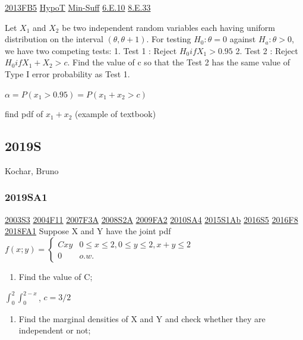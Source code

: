\documentclass[10pt,twocolumn,portrait]{article}
\providecommand{\tightlist}{%
  \setlength{\itemsep}{0pt}\setlength{\parskip}{0pt}}
\begin{document}
\protect\hyperlink{fb5}{2013FB5} \protect\hyperlink{HypoT}{HypoT}
\protect\hyperlink{Min-Suff}{Min-Suff} \protect\hyperlink{e.10}{6.E.10}
\protect\hyperlink{e.33}{8.E.33}

Let \(X_1\) and \(X_2\) be two independent random variables each having
uniform distribution on the interval \((\theta,\theta+1)\). For testing
\(H_0:\theta=0\) against \(H_a:\theta> 0\), we have two competing tests:
1. Test 1 : Reject \(H_0 if X_1>0.95\) 2. Test 2 : Reject
\(H_0 if X_1+X_2>c\). Find the value of c so that the Test 2 has the
same value of Type I error probability as Test 1.

\(\alpha=P(x_1>0.95)=P(x_1+x_2>c)\)

find pdf of \(x_1+x_2\) (example of textbook)

\hypertarget{s-11}{%
\subsection{2019S}\label{s-11}}

Kochar, Bruno

\hypertarget{sa1-3}{%
\subsubsection{2019SA1}\label{sa1-3}}

\protect\hyperlink{s3}{2003S3} \protect\hyperlink{f11}{2004F11}
\protect\hyperlink{f3a}{2007F3A} \protect\hyperlink{s2a}{2008S2A}
\protect\hyperlink{fa2}{2009FA2} \protect\hyperlink{sa4-1}{2010SA4}
\protect\hyperlink{s1ab}{2015S1Ab} \protect\hyperlink{s5-4}{2016S5}
\protect\hyperlink{f8-4}{2016F8} \protect\hyperlink{fa1-4}{2018FA1}
Suppose X and Y have the joint pdf
\(f(x;y) =\begin{cases}Cxy& 0\le x\le 2, 0\le y\le 2, x + y\le 2\\0& o.w.\end{cases}\)

\begin{enumerate}
\def\labelenumi{(\alph{enumi})}
\tightlist
\item
  Find the value of C;
\end{enumerate}

\(\int_0^2\int_0^{2-x}\), \(c=3/2\)

\begin{enumerate}
\def\labelenumi{(\alph{enumi})}
\setcounter{enumi}{1}
\tightlist
\item
  Find the marginal densities of X and Y and check whether they are
  independent or not;
\end{enumerate}
\end{document}
